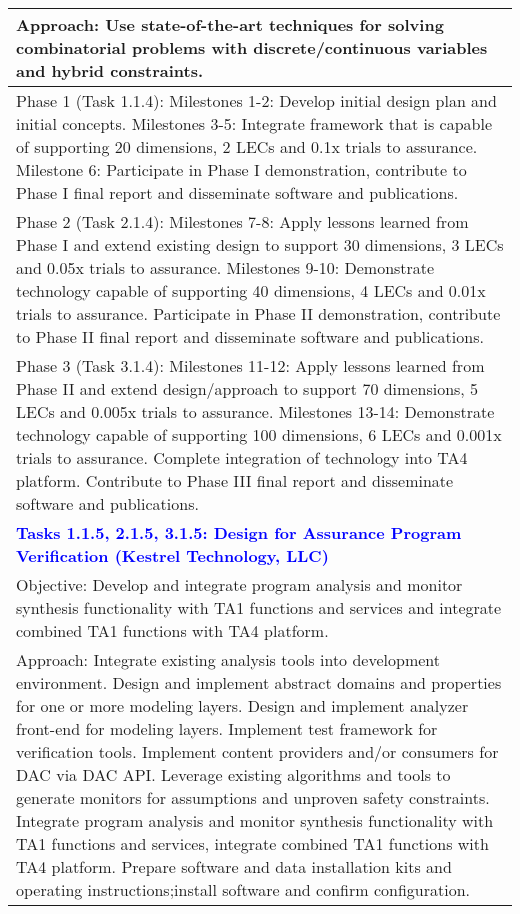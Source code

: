 {\begin{longtable} {|p{\textwidth} | }
Approach: Use state-of-the-art techniques for solving combinatorial problems with discrete/continuous variables and hybrid constraints. \\ \hline
Phase 1 (Task 1.1.4): Milestones 1-2: Develop initial design plan and initial concepts. Milestones 3-5: Integrate framework that is capable of supporting 20 dimensions, 2 LECs and 0.1x trials to assurance. Milestone 6: Participate in Phase I demonstration, contribute to Phase I final report and disseminate software and publications. \\ \hline
Phase 2 (Task 2.1.4): Milestones 7-8: Apply lessons learned from Phase I and extend existing design to support 30 dimensions, 3 LECs and 0.05x trials to assurance. Milestones 9-10: Demonstrate technology capable of supporting 40 dimensions, 4 LECs and 0.01x trials to assurance. Participate in Phase II demonstration, contribute to Phase II final report and disseminate software and publications. \\ \hline
Phase 3 (Task 3.1.4): Milestones 11-12: Apply lessons learned from Phase II and extend design/approach to support 70 dimensions, 5 LECs and 0.005x trials to assurance. Milestones 13-14: Demonstrate technology capable of supporting 100 dimensions, 6 LECs and 0.001x trials to assurance. Complete integration of technology into TA4 platform. Contribute to Phase III final report and disseminate software and publications. \\ \hline
\textcolor{blue} {\footnotesize {\textbf{Tasks 1.1.5, 2.1.5, 3.1.5: Design for Assurance Program Verification (Kestrel Technology, LLC)}}} \\ \hline
Objective: Develop and integrate program analysis and monitor synthesis functionality with TA1 functions and services and integrate combined TA1 functions with TA4 platform. \\ \hline
Approach: Integrate existing analysis tools into development environment.  Design and implement abstract domains and properties for one or more modeling layers.  Design and implement analyzer front-end for modeling layers.  Implement test framework for verification tools.  Implement content providers and/or consumers for DAC via DAC API.  Leverage existing algorithms and tools to generate monitors for assumptions and unproven safety constraints. Integrate program analysis and monitor synthesis functionality with TA1 functions and services, integrate combined TA1 functions with TA4 platform.   Prepare software and data installation kits and operating instructions;install software and confirm configuration. \\ \hline

\end{longtable}}
